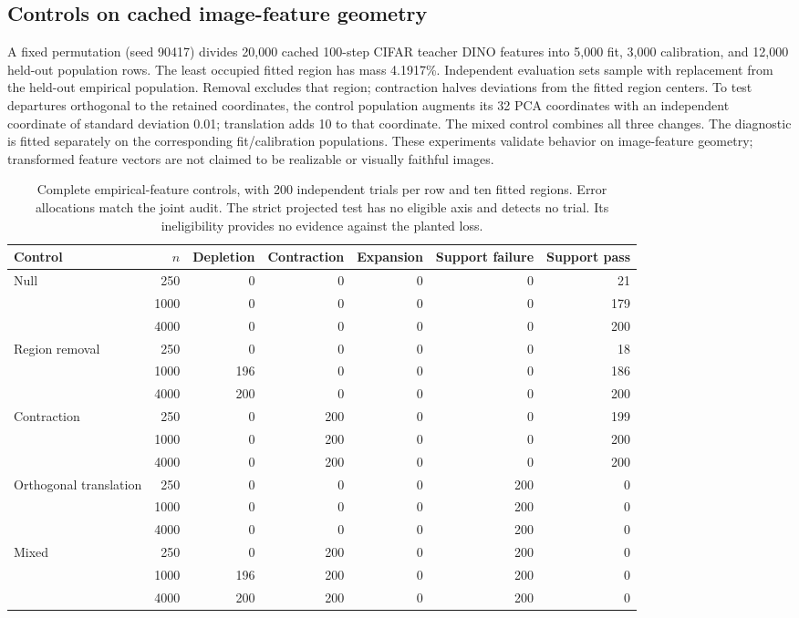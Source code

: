 \subsection{Controls on cached image-feature geometry}
A fixed permutation (seed 90417) divides 20,000 cached 100-step CIFAR teacher
DINO features into 5,000 fit, 3,000 calibration, and 12,000 held-out population
rows. The least occupied fitted region has mass 4.1917\%. Independent evaluation
sets sample with replacement from the held-out empirical population. Removal
excludes that region; contraction halves deviations from the fitted region
centers. To test departures orthogonal to the retained coordinates, the control
population augments its 32 PCA coordinates with an independent coordinate of
standard deviation 0.01; translation adds 10 to that coordinate. The mixed
control combines all three changes. The diagnostic is fitted separately on
the corresponding fit/calibration populations. These experiments validate
behavior on image-feature geometry; transformed feature vectors are not
claimed to be realizable or visually faithful images.

\begin{table}[t]
\centering\small
\setlength{\tabcolsep}{6pt}
\begin{tabular}{lrrrrrr}
\toprule
Control & $n$ & Depletion & Contraction & Expansion & Support failure & Support pass\\
\midrule
Null &250&0&0&0&0&21\\
&1000&0&0&0&0&179\\
&4000&0&0&0&0&200\\
Region removal &250&0&0&0&0&18\\
&1000&196&0&0&0&186\\
&4000&200&0&0&0&200\\
Contraction &250&0&200&0&0&199\\
&1000&0&200&0&0&200\\
&4000&0&200&0&0&200\\
Orthogonal translation &250&0&0&0&200&0\\
&1000&0&0&0&200&0\\
&4000&0&0&0&200&0\\
Mixed &250&0&200&0&200&0\\
&1000&196&200&0&200&0\\
&4000&200&200&0&200&0\\
\bottomrule
\end{tabular}
\caption{Complete empirical-feature controls, with 200 independent trials per
row and ten fitted regions. Error allocations match the joint audit. The strict
projected test has no eligible axis and detects no trial. Its ineligibility
provides no evidence against the planted loss.}
\label{tab:support-cifar}
\end{table}

